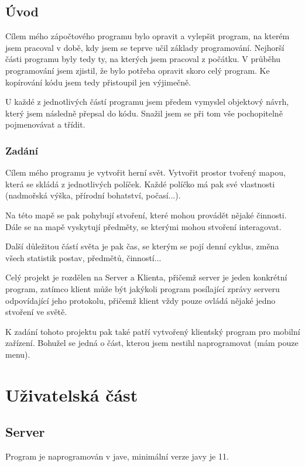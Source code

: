 \documentclass[12pt,a4paper]{report}
\begin{document}

\tableofcontents

\chapter{Úvod}
Cílem mého zápočtového programu bylo opravit a vylepšit program, na kterém jsem pracoval v době, kdy jsem se teprve učil základy programování. Nejhorší části programu byly tedy ty, na kterých jsem pracoval z počátku. V průběhu programování jsem zjistil, že bylo potřeba opravit skoro celý program. Ke kopírování kódu jsem tedy přistoupil jen výjimečně. 

U každé z jednotlivých částí programu jsem předem vymyslel objektový návrh, který jsem následně přepsal do kódu. Snažil jsem se při tom vše pochopitelně pojmenovávat a třídit. 


\section{Zadání}
Cílem mého programu je vytvořit herní svět. Vytvořit prostor tvořený mapou, která se skládá z jednotlivých políček. Každé políčko má pak své vlastnosti (nadmořská výška, přírodní bohatství, počasí...). 

Na této mapě se pak pohybují stvoření, které mohou provádět nějaké činnosti. Dále se na mapě vyskytují předměty, se kterými mohou stvoření interagovat. 

Další důležitou částí světa je pak čas, se kterým se pojí denní cyklus, změna všech statistik postav, předmětů, činností...

Celý projekt je rozdělen na Server a Klienta, přičemž server je jeden konkrétní program, zatímco klient může být jakýkoli program posílající zprávy serveru odpovídající jeho protokolu, přičemž klient vždy pouze ovládá nějaké jedno stvoření ve světě.  

K zadání tohoto projektu pak také patří vytvořený klientský program pro mobilní zařízení. Bohužel se jedná o část, kterou jsem nestihl naprogramovat (mám pouze menu).
\part{Uživatelská část}
\chapter{Server}
Program je naprogramován v jave, minimální verze javy je 11. 
\end{document}
